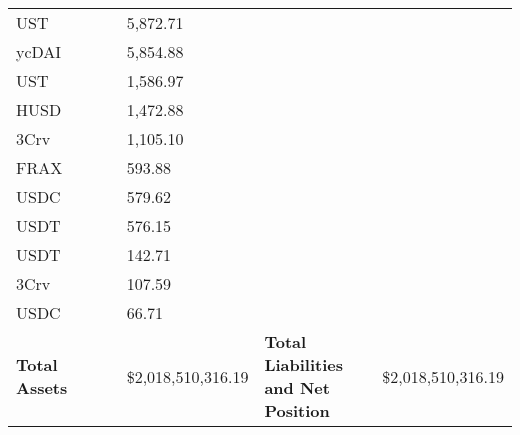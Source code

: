 \begin{longtable}{@{}p{0.25\linewidth}p{0.25\linewidth}p{0.25\linewidth}p{0.25\linewidth}@{}}
UST & 5,872.71 & & \\
ycDAI & 5,854.88 & & \\
UST & 1,586.97 & & \\
HUSD & 1,472.88 & & \\
3Crv & 1,105.10 & & \\
FRAX & 593.88 & & \\
USDC & 579.62 & & \\
USDT & 576.15 & & \\
USDT & 142.71 & & \\
3Crv & 107.59 & & \\
USDC & 66.71 & & \\

\midrule

\textbf{Total Assets} & \$2,018,510,316.19 & \textbf{Total Liabilities and Net Position} & \$2,018,510,316.19 \\

\bottomrule

\end{longtable}
